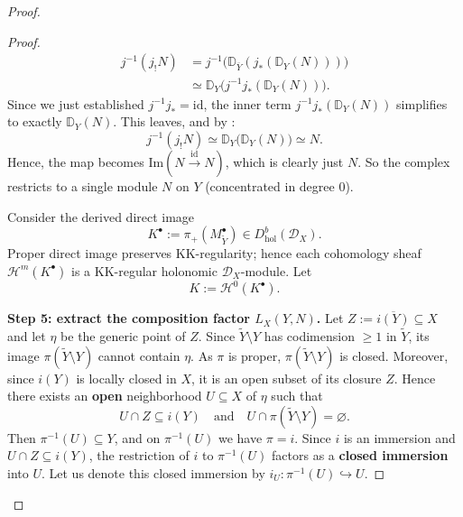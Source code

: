 \begin{remark}
\begin{proof}
\begin{enumerate}
\begin{proof}
                      \begin{align*}
                          j^{-1}(j_! N) & = j^{-1} \bigl( \mathbb{D}_{\overline Y} ( j_*( \mathbb{D}_Y(N) ) ) \bigr) \\
                                        & \simeq \mathbb{D}_Y \bigl( j^{-1} j_*( \mathbb{D}_Y(N) ) \bigr).
                      \end{align*}
                      Since we just established $j^{-1} j_* = \mathrm{id}$, the inner term $j^{-1} j_*(\mathbb{D}_Y(N))$
                      simplifies to exactly $\mathbb{D}_Y(N)$. This leaves, and by \cite[Prop.~2.6.5]{hotta2008d}:
                      \[
                          j^{-1}(j_! N) \simeq \mathbb{D}_Y \bigl( \mathbb{D}_Y(N) \bigr) \simeq N.
                      \]
                      Hence, the map becomes $\mathrm{Im}(N \xrightarrow{\mathrm{id}} N)$, which is clearly just $N$.
                      So the complex restricts to a single module $N$ on $Y$ (concentrated in degree 0).

                      Consider the derived direct image
                      \[
                          K^\bullet := \pi_+(M^\bullet_{\widetilde Y}) \in D^b_{\mathrm{hol}}(\mathcal D_X).
                      \]
                      Proper direct image preserves KK-regularity; hence each cohomology sheaf
                      $\mathcal H^m(K^\bullet)$ is a KK-regular holonomic $\mathcal D_X$-module.
                      Let
                      \[
                          K := \mathcal H^0(K^\bullet).
                      \]

                      \medskip
                      \textbf{Step 5: extract the composition factor $L_X(Y,N)$.}
                      Let $Z:=\overline{i(Y)}\subseteq X$ and let $\eta$ be the generic point of $Z$.
                      Since $\widetilde Y\setminus Y$ has codimension $\ge 1$ in $\widetilde Y$,
                      its image $\pi(\widetilde Y\setminus Y)$ cannot contain $\eta$.
                      As $\pi$ is proper, $\pi(\widetilde Y\setminus Y)$ is closed. Moreover, since $i(Y)$ is locally closed in $X$, it is an open subset of its closure $Z$. Hence there exists
                      an \textbf{open} neighborhood $U\subseteq X$ of $\eta$ such that
                      \[
                          U\cap Z\subseteq i(Y)\quad\text{and}\quad U\cap \pi(\widetilde Y\setminus Y)=\varnothing.
                      \]
                      Then $\pi^{-1}(U)\subseteq Y$, and on $\pi^{-1}(U)$ we have $\pi=i$. Since $i$ is an immersion and $U\cap Z \subseteq i(Y)$, the restriction of $i$ to $\pi^{-1}(U)$ factors as a \textbf{closed immersion} into $U$.
                      Let us denote this closed immersion by $i_U : \pi^{-1}(U) \hookrightarrow U$.


\end{proof}
\end{enumerate}
\end{proof}
\end{remark}
